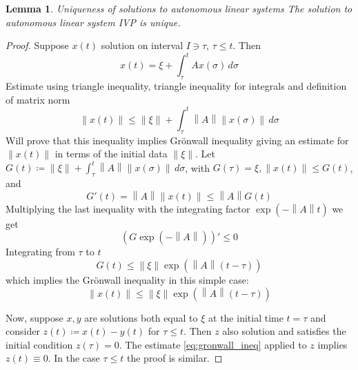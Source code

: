\documentclass{article}
\newtheorem{lemma}[theorem]{Lemma}
\newcommand{\norm}[1]{\left\lVert#1\right\rVert}
\begin{document}
\begin{lemma}{Uniqueness of solutions to autonomous linear systems}
	The solution to autonomous linear system IVP is unique.
\end{lemma}
\begin{proof}
	Suppose $x(t)$ solution on interval $I \ni \tau$, $\tau \le t$. Then
	$$ x(t) = \xi + \int_\tau^t Ax(\sigma) \, d\sigma $$
	Estimate using triangle inequality, triangle inequality for integrals and definition of matrix norm
	$$ \norm{x(t)} \le \norm \xi + \int_\tau^t \norm A \norm{x(\sigma)} \, d\sigma $$
	Will prove that this inequality implies Grönwall inequality
	giving an estimate for $\norm{x(t)}$ in terms of the initial data $\norm \xi$.
	Let $G(t) \coloneqq \norm \xi + \int_\tau^t \norm A \norm{x(\sigma)} \, d\sigma $,
	with $G(\tau) = \xi, \norm{x(t)} \le G(t)$, and
	$$ G'(t) = \norm A \norm{x(t)} \le \norm A G(t) $$
	Multiplying the last inequality with the integrating factor $\exp(-\norm A t)$ we get
	$$ (G \exp(-\norm A))' \le 0 $$
	Integrating from $\tau$ to $t$
	$$ G(t) \le \norm \xi \exp(\norm A (t - \tau)) $$
	which implies the Grönwall inequality in this simple case:
	\begin{equation}\label{eq:gronwall_ineq}
		\norm{x(t)} \le \norm \xi \exp(\norm A (t - \tau))
	\end{equation}

	Now, suppose $x, y$ are solutions both equal to $\xi$ at the initial time $t = \tau$
	and consider $z(t) \coloneqq x(t) - y(t)$ for $\tau \le t$.
	Then $z$ also solution and satisfies the initial condition $z(\tau) = 0$.
	The estimate \eqref{eq:gronwall_ineq} applied to $z$ implies $z(t) \equiv 0$.
	In the case $\tau \le t$ the proof is similar.
\end{proof}
\end{document}
